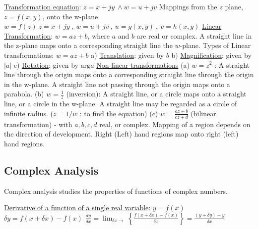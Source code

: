 \documentclass[12pt]{article}
\begin{document}
\begin{flushleft}
	\textbullet \quad \uline{Transformation equation}: $z = x +jy \ \land w = u + jv $ \linebreak 
	Mappings from the $z$ plane, $z=f(x,y)$, onto the w-plane $w=f(z)\ z=x+jy\ , \ w=u+jv\ , \ u=g(x,y)\ , \ v=h(x,y) $ \linebreak 
	\textbullet \quad \uline{Linear Transformation}: $w=az + b$, where $a$ and $b$ are real or complex. A straight line in the z-plane maps onto a corresponding straight line the $w$-plane. \linebreak 
	\textbullet \quad Types of Linear transformations: $w=az+b$ \linebreak 
	a) \uline{Translation}: given by $b$ \linebreak 
	b) \uline{Magnification}: given by $|a|$ \linebreak 
	c) \uline{Rotation}: given by $ \text{arg} a$ \linebreak 
	\textbullet \quad \uline{Non-linear transformations} \linebreak 
	(a) $w=z^2$  :  A straight line through the origin maps onto a corresponding straight line through the origin in the w-plane. A straight line not passing through the origin maps onto a parabola. \linebreak 
	(b) $w=\frac{1}{z}$ (inversion): A straight line, or a circle maps onto a straight line, or a circle in the w-plane. A straight line may be regarded as a circle of infinite radius. ($z=1/w$  :  to find the equation) \linebreak 
	(c) $\displaystyle w=\frac{az+b}{cz+d} $ (bilinear transformation) - with $a,b,c,d$ real, or complex. \linebreak 
	\textbullet \quad Mapping of a region depends on the direction of development. \linebreak 
	Right (Left) hand regions map onto right (left) hand regions. \linebreak 
	
	\subsection{Complex Analysis}

	\textbullet \quad Complex analysis studies the properties of functions of complex numbers. \linebreak 
	
	\textbullet \quad \uline{Derivative of a function of a single real variable}: $y=f(x)$ \linebreak 
	$\delta y = f(x + \delta x) - f(x) $ \linebreak 
	$\displaystyle \frac{dy}{dx} = \lim_{\delta x \to } \left\{ \frac{f(x+\delta x) -f(x)}{\delta x} \right\} = \frac{(y+\delta y) -y}{\delta x} $ \linebreak 
		

\end{flushleft}
\end{document}
